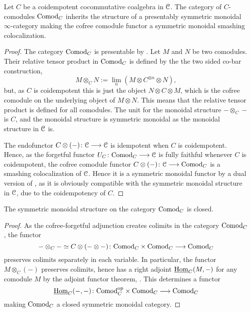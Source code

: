 \begin{lemma}
    \label{ch2:lm:coidempotent-then-comod-monoidal}
    Let $C$ be a coidempotent cocommutative coalgebra in $\EuScript{C}$. The category of $C$-comodules $\mathrm{Comod}_C$ inherits the structure of a presentably symmetric monoidal $\infty$-category making the cofree comodule functor a symmetric monoidal smashing colocalization.
\end{lemma}
\begin{proof}
    The category $\mathrm{Comod}_C$ is presentable by \cite[2.1.11]{peroux_2020}. Let $M$ and $N$ be two comodules. Their relative tensor product in $\mathrm{Comod}_C$ is defined by the the two sided co-bar construction,
    \[M\otimes_C N := \lim_n (M \otimes C^{\otimes n} \otimes N),\]
    but, as $C$ is coidempotent this is just the object $N\otimes C\otimes M$, which is the cofree comodule on the underlying object of $M\otimes N$. This means that the relative tensor product is defined for all comodules. The unit for the monoidal structure $-\otimes_C-$ is $C$, and the monoidal structure is symmetric monoidal as the monoidal structure in $\EuScript{C}$ is. 

    The endofunctor $C\otimes (-)\colon \EuScript{C}\longrightarrow \EuScript{C}$ is idempotent when $C$ is coidempotent. Hence, as the forgetful functor $U_C\colon \mathrm{Comod}_C\longrightarrow \EuScript{C}$ is fully faithful whenever $C$ is coidempotent, the cofree comodule functor $C\otimes (-)\colon \EuScript{C}\longrightarrow \mathrm{Comod}_C$ is a smashing colocalization of $\EuScript{C}$. Hence it is a symmetric monoidal functor by a dual version of \cite[2.2.1.9]{Lurie_HA}, as it is obviously compatible with the symmetric monoidal structure in $\EuScript{C}$, due to the coidempotency of $C$. 
\end{proof}

\begin{lemma}
    The symmetric monoidal structure on the category $\mathrm{Comod}_C$ is closed. 
\end{lemma}
\begin{proof}
    As the cofree-forgetful adjunction creates colimits in the category $\mathrm{Comod}_C$, the functor 
    \[-\otimes_C- \simeq C\otimes (-\otimes -)\colon \mathrm{Comod}_C \times \mathrm{Comod}_C \longrightarrow \mathrm{Comod}_C\] 
    preserves colimits separately in each variable. In particular, the functor $M\otimes_C (-)$ preserves colimits, hence has a right adjoint $\operatorname{\underline{Hom}}_C(M,-)$ for any comodule $M$ by the adjoint functor theorem, \cite[5.5.2.9]{lurie_09}. This determines a functor 
    \[\operatorname{\underline{Hom}}_C(-,-)\colon \mathrm{Comod}_C^{\mathrm{op}}\times \mathrm{Comod}_C\longrightarrow \mathrm{Comod}_C\]
    making $\mathrm{Comod}_C$ a closed symmetric monoidal category.  
\end{proof}


